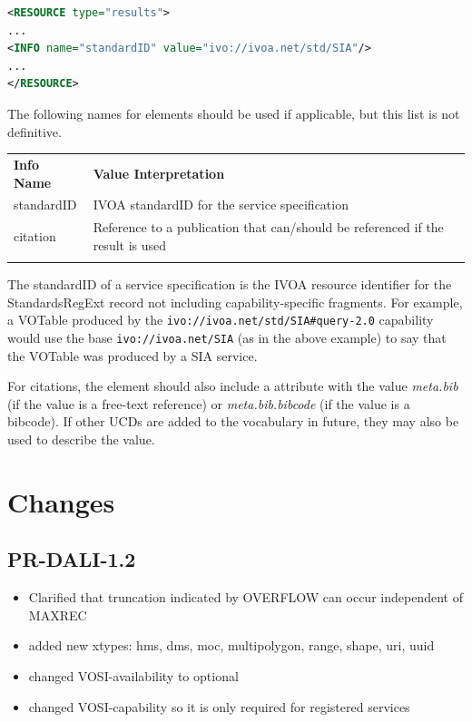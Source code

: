 \documentclass[11pt,letter]{ivoa}
\begin{document}
\begin{lstlisting}[language=XML]
<RESOURCE type="results">
...
<INFO name="standardID" value="ivo://ivoa.net/std/SIA"/>
...
</RESOURCE>
\end{lstlisting}

The following names for  elements should be used if applicable, but this
list is not definitive.

\begin{tabular}{l p{8cm}}
\sptablerule
\textbf{Info Name}&\textbf{Value Interpretation}\\
\sptablerule
standardID & IVOA standardID for the service specification \\
citation & Reference to a publication that can/should be referenced if the
result is used \\
\sptablerule
\end{tabular}

The standardID of a service specification is the IVOA resource identifier for
the StandardsRegExt record not including capability-specific fragments. For example,
a VOTable produced by the \verb|ivo://ivoa.net/std/SIA#query-2.0| capability
would use the base \verb|ivo://ivoa.net/SIA| (as in the above example) to say that
the VOTable was produced by a SIA service.

For citations, the  element should also include a
 attribute with the
value \emph{meta.bib} (if the value is a free-text reference) or
\emph{meta.bib.bibcode} (if
the value is a bibcode). If other  UCDs are added to the vocabulary in
future, they may also be used to describe the value.

\appendix

\section{Changes}

\subsection{PR-DALI-1.2}
\begin{itemize}
\item Clarified that truncation indicated by OVERFLOW can occur independent of
MAXREC
\item added new xtypes: hms, dms, moc, multipolygon, range, shape, uri, uuid
\item changed VOSI-availability to optional
\item changed VOSI-capability so it is only required for registered services
\end{itemize}
\end{document}
